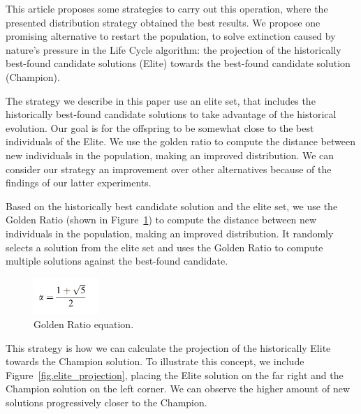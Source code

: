 \documentclass[graybox]{svmult}
\begin{document}
        This article proposes some strategies to carry out this operation,
        where the presented distribution strategy obtained the best results. We
        propose one promising alternative to restart the population, to solve
        extinction caused by nature's pressure in the Life Cycle algorithm: the
        projection of the historically best-found candidate solutions (Elite)
        towards the best-found candidate solution (Champion).

        The strategy we describe in this paper use an elite set, that includes
        the historically best-found candidate solutions to take
        advantage of the historical evolution. Our goal is for the offspring to
        be somewhat close to the best individuals of the Elite.
        We use the golden ratio to compute the distance between new individuals in the population, making
        an improved distribution. We can consider our strategy an improvement 
        over other alternatives because of the findings of our latter experiments.

        Based on the historically best candidate
        solution and the elite set, we use the Golden Ratio (shown in
        Figure~\ref{fig.golden_ratio}) to compute the distance between new individuals
        in the population, making an improved distribution. It randomly selects a
        solution from the elite set and uses the Golden Ratio 
        \cite{nematollahi2020novel, gaikwad2021face, khesin2022golden, sym13081334, https://doi.org/10.1111/nyas.14895} 
        to compute multiple solutions against the best-found candidate.

        \begin{figure}
            \centering
            \includegraphics[width=25mm]{img/fig_golden_ratio.pdf}
            \caption{Golden Ratio equation.} \label{fig.golden_ratio}
            \end{figure}

        This strategy is how we can calculate the projection of the
        historically Elite towards the Champion solution. To illustrate this
        concept, we include Figure~\ref{fig.elite_projection}, placing the
        Elite solution on the far right and the Champion solution on the left
        corner. We can observe the higher amount of new solutions progressively
        closer to the Champion.
        
\end{document}
